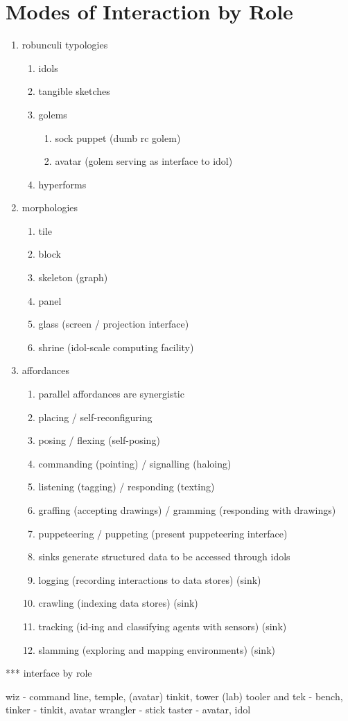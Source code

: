 \section{Modes of Interaction by Role}
\label{sec:interaction_modes}
    \begin{enumerate}
        \item robunculi typologies
        \begin{enumerate}
            \item idols
            \item tangible sketches
            \item golems
            \begin{enumerate}
                \item sock puppet (dumb rc golem)
                \item avatar (golem serving as interface to idol)
            \end{enumerate}
            \item hyperforms
        \end{enumerate}
        \item morphologies
        \begin{enumerate}
            \item tile
            \item block
            \item skeleton (graph)
            \item panel
            \item glass (screen / projection interface)
            \item shrine (idol-scale computing facility)
        \end{enumerate}
        \item affordances
        \begin{enumerate}
            \item parallel affordances are synergistic
            \item placing / self-reconfiguring
            \item posing / flexing (self-posing)
            \item commanding (pointing) / signalling (haloing)
            \item listening (tagging) / responding (texting)
            \item graffing (accepting drawings) / gramming (responding with drawings)
            \item puppeteering / puppeting (present puppeteering interface)
            \item sinks generate structured data to be accessed through idols
            \item logging (recording interactions to data stores) (sink)
            \item crawling (indexing data stores) (sink)
            \item tracking (id-ing and classifying agents with sensors) (sink)
            \item slamming (exploring and mapping environments) (sink)
        \end{enumerate}
    \end{enumerate}

*** interface by role

wiz - command line, temple, (avatar) tinkit, tower (lab)
tooler and tek - bench, 
tinker - tinkit, avatar
wrangler - stick
taster - avatar, idol



